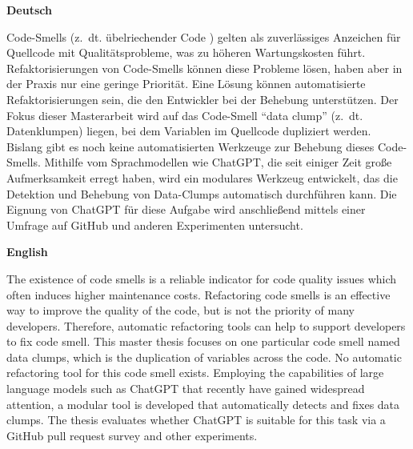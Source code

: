 \textbf{Deutsch}
\begin{comment}
Data-Clumps (z.~dt. Datenklumpen) sind ein häufig vorkommendes Indiz für schlechte Codequalität. Viele Data-Clumps werden nicht behoben, da dies nicht die Priorität der Entwickler ist und die Behebung zeitaufwendig sein kann. Eine alternative Möglichkeit zur Behebung von Data-Clumps sind automatisierte Refaktorisierungen. Hierfür gibt es aber noch keine passenden Tools. Ziel dieser Masterarbeit ist es, ein modulares Programm zu entwickeln, dass Data-Clumps findet und refaktorisiert, indem andere Programme und Dienste verwendet und kombiniert werden. Dabei soll ein Austausch von Programmen und Diensten so leicht wie möglich gemacht werden. Ein großer Fokus der Masterarbeit wird die Integration des Sprachmodells ChatGPT sein, welches als Dienst zur Verfügung gestellt werden, um zu prüfen, ob es Data-Clumps effektiv finden und refaktorisieren kann.
\end{comment}
Code-Smells (z.~dt. übelriechender Code ) gelten als zuverlässiges Anzeichen für Quellcode mit Qualitätsprobleme, was zu höheren Wartungskosten führt. Refaktorisierungen von Code-Smells können diese Probleme lösen, haben aber in der Praxis nur eine geringe Priorität. Eine Lösung können automatisierte Refaktorisierungen sein, die den Entwickler bei der Behebung unterstützen. Der Fokus dieser Masterarbeit wird auf das Code-Smell \enquote{data clump} (z.~dt. Datenklumpen) liegen, bei dem Variablen im Quellcode dupliziert werden. Bislang gibt es noch keine automatisierten Werkzeuge zur Behebung dieses Code-Smells. Mithilfe vom Sprachmodellen wie ChatGPT, die  seit einiger Zeit große Aufmerksamkeit erregt haben,  wird ein modulares Werkzeug entwickelt, das die Detektion und Behebung von Data-Clumps automatisch durchführen kann.  Die Eignung von ChatGPT für diese Aufgabe wird  anschließend mittels einer Umfrage auf GitHub und anderen Experimenten untersucht. 
\bigskip

\noindent
\textbf{English} 

The existence of code smells is a reliable indicator for code quality issues which often induces higher maintenance costs. Refactoring code smells is an effective way to improve the quality of the code, but is not the priority of many developers.  Therefore, automatic refactoring tools can help to support developers to fix code smell. This master thesis focuses on one particular code  smell named data clumps, which is the duplication of variables across the code. No automatic refactoring tool for this code smell exists. Employing the capabilities of large language models such as ChatGPT that  recently have gained widespread attention, a modular tool is developed  that automatically detects and fixes data clumps. The thesis evaluates whether ChatGPT is suitable for this task via a GitHub pull request survey and other experiments. 

